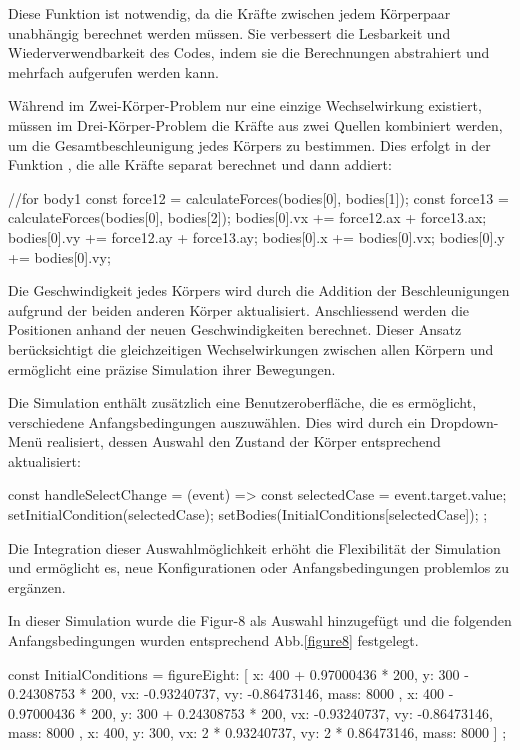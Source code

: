 \documentclass[a4paper,12pt,twoside]{article}
\begin{document}
Diese Funktion ist notwendig, da die Kräfte zwischen jedem Körperpaar unabhängig 
berechnet werden müssen. Sie verbessert die Lesbarkeit und Wiederverwendbarkeit 
des Codes, indem sie die Berechnungen abstrahiert und mehrfach aufgerufen werden kann.

Während im Zwei-Körper-Problem nur eine einzige Wechselwirkung existiert, müssen 
im Drei-Körper-Problem die Kräfte aus zwei Quellen kombiniert werden, um die 
Gesamtbeschleunigung jedes Körpers zu bestimmen. Dies erfolgt in der Funktion 
, die alle Kräfte separat berechnet und dann addiert:

\begin{javascript}
//for body1
const force12 = calculateForces(bodies[0], bodies[1]);
const force13 = calculateForces(bodies[0], bodies[2]);
bodies[0].vx += force12.ax + force13.ax;
bodies[0].vy += force12.ay + force13.ay;
bodies[0].x += bodies[0].vx;
bodies[0].y += bodies[0].vy;
\end{javascript}

Die Geschwindigkeit jedes Körpers wird durch die Addition der Beschleunigungen 
aufgrund der beiden anderen Körper aktualisiert. Anschliessend werden die Positionen 
anhand der neuen Geschwindigkeiten berechnet. Dieser Ansatz berücksichtigt die 
gleichzeitigen Wechselwirkungen zwischen allen Körpern und ermöglicht eine präzise 
Simulation ihrer Bewegungen.

Die Simulation enthält zusätzlich eine Benutzeroberfläche, die es ermöglicht, 
verschiedene Anfangsbedingungen auszuwählen. Dies wird durch ein Dropdown-Menü 
realisiert, dessen Auswahl den Zustand der Körper entsprechend aktualisiert:

\begin{javascript}
    const handleSelectChange = (event) => {
    const selectedCase = event.target.value;
    setInitialCondition(selectedCase);
    setBodies(InitialConditions[selectedCase]);
};
\end{javascript}

Die Integration dieser Auswahlmöglichkeit erhöht die Flexibilität der Simulation und 
ermöglicht es, neue Konfigurationen oder Anfangsbedingungen problemlos zu ergänzen.

In dieser Simulation wurde die Figur-8 als Auswahl hinzugefügt und die folgenden 
Anfangsbedingungen wurden entsprechend Abb.\ref{figure8} festgelegt. 

\begin{javascript}
    const InitialConditions = {
        figureEight: [
            { x: 400 + 0.97000436 * 200, y: 300 - 0.24308753 * 200, vx: -0.93240737, vy: -0.86473146, mass: 8000 },
            { x: 400 - 0.97000436 * 200, y: 300 + 0.24308753 * 200, vx: -0.93240737, vy: -0.86473146, mass: 8000 },
            { x: 400, y: 300, vx: 2 * 0.93240737, vy: 2 * 0.86473146, mass: 8000}
        ]
    };
\end{javascript}
\end{document}
